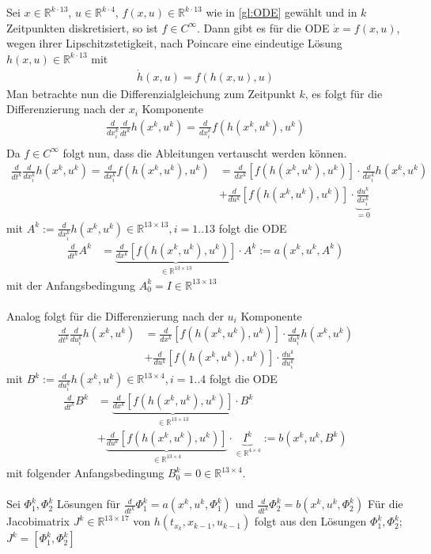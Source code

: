Sei $x \in \mathbb{R}^{k \cdot 13}$, $u \in \mathbb{R}^{k \cdot 4}$, $f(x, u) \in \mathbb{R}^{k \cdot 13}$ wie in \ref{gl:ODE} gewählt und in $k$ Zeitpunkten diskretisiert, so ist $f \in C^{\infty}$. Dann gibt es für die ODE $\dot {x} = f(x, u)$, wegen ihrer Lipschitzstetigkeit, nach Poincare eine eindeutige Lösung $h(x, u) \in \mathbb{R}^{k \cdot 13}$ mit 
\begin{align*}
 	\dot h(x, u) = f(h(x, u), u)
\end{align*}
Man betrachte nun die Differenzialgleichung zum Zeitpunkt $k$, es folgt für die Differenzierung nach der $x_i$ Komponente
\begin{align*}
	\frac{d}{dx^k_i} \frac{d}{dt^k} h(x^k, u^k) = \frac{d}{dx^k_i} f(h(x^k, u^k), u^k) \\
\end{align*}
Da $f \in C^{\infty}$ folgt nun, dass die Ableitungen vertauscht werden können.
\begin{align*}
\frac{d}{dt^k} \frac{d}{dx^k_i} h(x^k, u^k) = \frac{d}{dx^k_i} f(h(x^k, u^k), u^k)  &= \frac{d}{dx^k} \left[f(h(x^k, u^k), u^k) \right] \cdot \frac{d}{dx^k_i}h(x^k, u^k) \\
&+ \frac{d}{du^k}\left[ f(h(x^k, u^k), u^k)  \right] \cdot \underbrace{\frac{du^k}{dx^k_i}}_{=0}
\end{align*}
mit $A^k := \frac{d}{dx^k_i} h(x^k, u^k) \in \mathbb{R}^{13 \times 13}, i = 1..13$ folgt die ODE  
\begin{align*}
\frac{d}{dt^k} A^k &= \underbrace{\frac{d}{dx^k} \left[f(h(x^k, u^k), u^k) \right]}_{\in \mathbb{R}^{13 \times 13}} \cdot A^k := a(x^k, u^k, A^k)
\end{align*}
mit der Anfangsbedingung $A_0^k = I \in \mathbb{R}^{13 \times 13} $ \\\\
Analog folgt für die Differenzierung nach der $u_i$ Komponente
\begin{align*}
\frac{d}{dt^k} \frac{d}{du^k_i} h(x^k, u^k) &= \frac{d}{dx^k} \left[f(h(x^k, u^k), u^k) \right] \cdot \frac{d}{du^k_i}h(x^k, u^k) \\
&+ \frac{d}{du^k}\left[ f(h(x^k, u^k), u^k)  \right] \cdot \frac{du^k}{du^k_i}
\end{align*}
mit $B^k := \frac{d}{du^k_i} h(x^k, u^k) \in \mathbb{R}^{13 \times 4}, i = 1..4$ folgt die ODE 
\begin{align*}
\frac{d}{dt^k} B^k &= \underbrace{\frac{d}{dx^k} \left[f(h(x^k, u^k), u^k) \right]}_{\in \mathbb{R}^{13 \times 13}} \cdot B^k \\
&+ \underbrace{
	\frac{d}{du^k}
		\left[ f(h(x^k, u^k), u^k)  \right]
		   }_
{\in \mathbb{R}^{13 \times 4}}
		   \cdot \underbrace{I^k}_{\in \mathbb{R}^{4 \times 4}} :=b(x^k, u^k, B^k)
\end{align*}
mit folgender Anfangsbedingung $B_0^k = 0 \in \mathbb{R}^{13 \times 4}$. \\
\\
Sei $\Phi_1^k, \Phi_2^k$ Lösungen für $\frac{d}{dt^k} \Phi_1^k = a(x^k, u^k, \Phi_1^k)$ und $\frac{d}{dt^k} \Phi_2^k = b(x^k, u^k, \Phi_2^k)$ Für die Jacobimatrix $J^k \in \mathbb{R}^{13 \times 17}$ von $h(t_{x_k}, x_{k-1}, u_{k-1})$ folgt aus den Lösungen $\Phi_1^k, \Phi_2^k$; $J^k =[\Phi_1^k, \Phi_2^k]$
